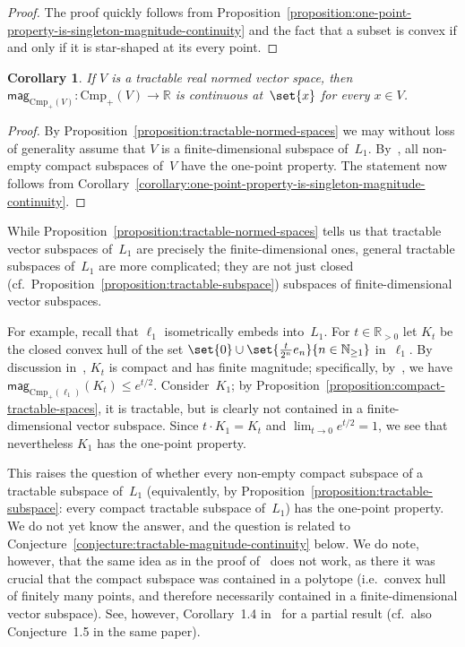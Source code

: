 \documentclass[11pt]{article}
\theoremstyle{plain}
\newtheorem{corollary}[theorem]{Corollary}
\theoremstyle{definition}
\newcommand{\NN}{\mathbb{N}}
\newcommand{\RR}{\mathbb{R}}
\newcommand{\mg}[1][]{\mathsf{mag}_{#1}}
\newcommand{\csub}{\mathrm{Cmp}}
\newcommand{\icsub}{\csub_{+}}
\begin{document}
\begin{proof}
The proof quickly follows from Proposition~\ref{proposition:one-point-property-is-singleton-magnitude-continuity} and the fact that a subset is convex if and only if it is star-shaped at its every point.
\end{proof}

\begin{corollary}
If $V$ is a tractable real normed vector space, then $\mg[\icsub(V)]\colon \icsub(V) \to \RR$ is continuous at~$\set{x}$ for every $x \in V$.
\end{corollary}

\begin{proof}
By Proposition~\ref{proposition:tractable-normed-spaces} we may without loss of generality assume that $V$ is a finite-dimensional subspace of~$L_1$. By~\cite[Theorem~3.1]{leinster2023spaces}, all non-empty compact subspaces of~$V$ have the one-point property. The statement now follows from Corollary~\ref{corollary:one-point-property-is-singleton-magnitude-continuity}.
\end{proof}

While Proposition~\ref{proposition:tractable-normed-spaces} tells us that tractable vector subspaces of~$L_1$ are precisely the finite-dimensional ones, general tractable subspaces of~$L_1$ are more complicated; they are not just closed (cf.~Proposition~\ref{proposition:tractable-subspace}) subspaces of finite-dimensional vector subspaces.

For example, recall that $\ell_1$ isometrically embeds into~$L_1$. For $t \in \RR_{> 0}$ let $K_t$ be the closed convex hull of the set $\set{0} \cup \set{\tfrac{t}{2^n} e_n}{n \in \NN_{\geq 1}}$ in~$\ell_1$. By discussion in~\cite[Section~2]{leinster2023spaces}, $K_t$ is compact and has finite magnitude; specifically, by~\cite[Remark~2.2]{leinster2023spaces}, we have $\mg[\icsub(\ell_1)](K_t) \leq e^{t/2}$. Consider~$K_1$; by Proposition~\ref{proposition:compact-tractable-spaces}, it is tractable, but is clearly not contained in a finite-dimensional vector subspace. Since $t \cdot K_1 = K_t$ and $\lim_{t \to 0} e^{t/2} = 1$, we see that nevertheless $K_1$ has the one-point property.

This raises the question of whether every non-empty compact subspace of a tractable subspace of~$L_1$ (equivalently, by Proposition~\ref{proposition:tractable-subspace}: every compact tractable subspace of~$L_1$) has the one-point property. We do not yet know the answer, and the question is related to Conjecture~\ref{conjecture:tractable-magnitude-continuity} below. We do note, however, that the same idea as in the proof of~\cite[Theorem~3.1]{leinster2023spaces} does not work, as there it was crucial that the compact subspace was contained in a polytope (i.e.~convex hull of finitely many points, and therefore necessarily contained in a finite-dimensional vector subspace). See, however, Corollary~1.4 in~\cite{Meckes_2023} for a partial result (cf.~also Conjecture~1.5 in the same paper).
\end{document}
